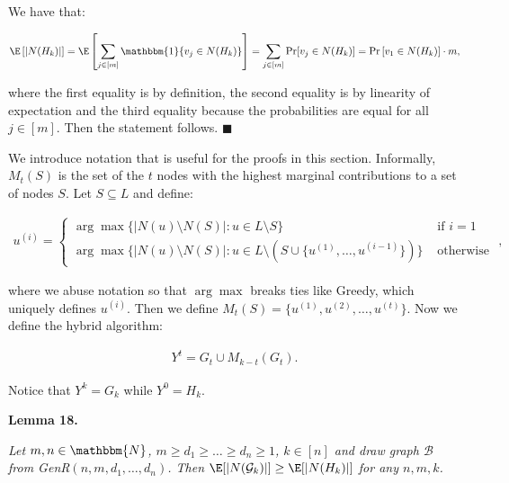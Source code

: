 \documentclass[10pt,a4paper]{article}
\begin{document}
We have that:\par


\[\begin{gathered}
\displaystyle\E\left[|N(H_{k})|\right]=\E\left[\sum_{j\in[m]}{\mathbbm{1}\{v_{j}\in N(H_{k})\}}\right]=\sum_{j\in[m]}{\Pr[v_{j}\in N(H_{k})]}=\Pr\left[v_{1}\in N(H_{k})\right]\cdot m,
\end{gathered}\]


where the first equality is by definition, the second equality is by linearity of expectation and the third equality because the probabilities are equal for all $j\in[m]$. Then the statement follows.
\ensuremath{\blacksquare}\par





We introduce notation that is useful for the proofs in this section.
Informally, $M_{t}(S)$ is the set of the $t$ nodes with the highest marginal contributions to a set of nodes $S$.
Let $S\subseteq L$ and define:\par


\[\begin{gathered}
\displaystyle u^{(i)}=\begin{cases}\arg\max\{|N(u)\setminus N(S)|:u\in L\setminus S\}&\text{ if }i=1\\
\arg\max\{|N(u)\setminus N(S)|:u\in L\setminus\left(S\cup\{u^{(1)},\dots,u^{(i-1)}\}\right)\}&\text{ otherwise }\end{cases},
\end{gathered}\]


where we abuse notation so that $\arg\max$ breaks ties like Greedy, which uniquely defines $u^{(i)}$.
Then we define $M_{t}(S)=\{u^{(1)},u^{(2)},\dots,u^{(t)}\}$.
Now we define the hybrid algorithm:\par


\[\begin{gathered}
\displaystyle Y^{t}=G_{t}\cup M_{k-t}(G_{t}).
\end{gathered}\]


Notice that $Y^{k}=G_{k}$ while $Y^{0}=H_{k}$.\par





\par\medskip\noindent\textbf{\textbf{Lemma 18}\textbf{.}}\par



\emph{Let $m,n\in\mathbbm{N}$, $m\geq d_{1}\geq\dots\geq d_{n}\geq 1$, $k\in[n]$ and draw graph $\mathcal{B}$ from GenR$(n,m,d_{1},\dots,d_{n})$. Then $\E[|N(\mathcal{G}_{k})|]\geq\E[|N(H_{k})|]$ for any $n,m,k$.}\par
\end{document}
